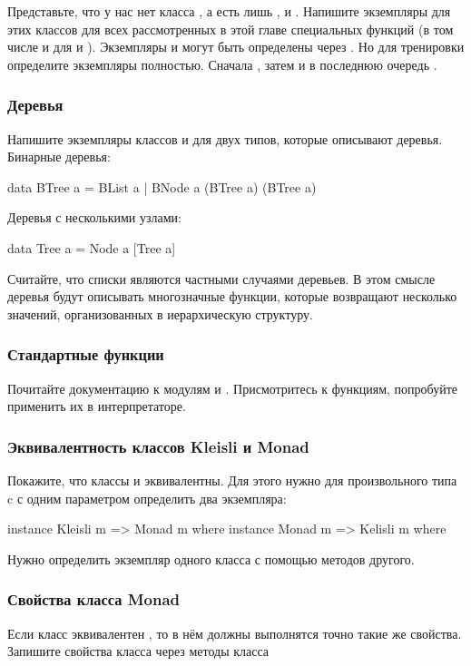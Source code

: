 Представьте, что у нас нет класса , а есть лишь
,  и . Напишите экземпляры для
этих классов для всех рассмотренных в этой главе специальных функций (в
том числе и для  и ). Экземпляры  и
 могут быть определены через . Но для
тренировки определите экземпляры полностью. Сначала , затем
 и в последнюю очередь .

\subsubsection{Деревья}

Напишите экземпляры классов  и  для двух типов,
которые описывают деревья. Бинарные деревья:


\begin{code}
data BTree a = BList a | BNode a (BTree a) (BTree a)
\end{code}

Деревья с несколькими узлами:


\begin{code}
data Tree a = Node a [Tree a]
\end{code}

Считайте, что списки являются частными случаями деревьев. В этом смысле
деревья будут описывать многозначные функции, которые возвращают
несколько значений, организованных в иерархическую структуру.

\subsubsection{Стандартные функции}

Почитайте документацию к модулям  и
. Присмотритесь к функциям, попробуйте применить
их в интерпретаторе.

\subsubsection{Эквивалентность классов Kleisli и Monad}

Покажите, что классы  и  эквивалентны. Для этого
нужно для произвольного типа c с одним параметром  определить два
экземпляра:


\begin{code}
instance Kleisli m => Monad   m where
instance Monad   m => Kelisli m where
\end{code}

Нужно определить экземпляр одного класса с помощью методов другого.

\subsubsection{Свойства класса Monad}

Если класс  эквивалентен , то в нём должны
выполнятся точно такие же свойства. Запишите свойства класса
 через методы класса 
